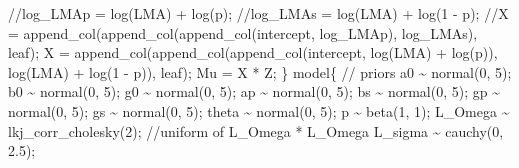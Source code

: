\documentclass[
  12pt,
  letterpaper,
  DIV=11,
  numbers=noendperiod]{scrartcl}
\newenvironment{Shaded}{\begin{snugshade}}{\end{snugshade}}
\newcommand{\CommentTok}[1]{\textcolor[rgb]{0.37,0.37,0.37}{#1}}
\newcommand{\DecValTok}[1]{\textcolor[rgb]{0.68,0.00,0.00}{#1}}
\newcommand{\FloatTok}[1]{\textcolor[rgb]{0.68,0.00,0.00}{#1}}
\newcommand{\KeywordTok}[1]{\textcolor[rgb]{0.00,0.23,0.31}{#1}}
\newcommand{\NormalTok}[1]{\textcolor[rgb]{0.00,0.23,0.31}{#1}}
\begin{document}
\begin{Shaded}
\begin{Highlighting}[]
  \CommentTok{//log\_LMAp = log(LMA) + log(p);}
  \CommentTok{//log\_LMAs = log(LMA) + log(1 {-} p);}
  \CommentTok{//X = append\_col(append\_col(append\_col(intercept, log\_LMAp), log\_LMAs), leaf);}
\NormalTok{  X = append\_col(append\_col(append\_col(intercept,}
\NormalTok{    log(LMA) + log(p)),}
\NormalTok{    log(LMA) + log(}\DecValTok{1}\NormalTok{ {-} p)),}
\NormalTok{     leaf);}
\NormalTok{  Mu = X * Z;}
\NormalTok{\}}
\KeywordTok{model}\NormalTok{\{}
  \CommentTok{// priors}
\NormalTok{  a0 \textasciitilde{} normal(}\DecValTok{0}\NormalTok{, }\DecValTok{5}\NormalTok{);}
\NormalTok{  b0 \textasciitilde{} normal(}\DecValTok{0}\NormalTok{, }\DecValTok{5}\NormalTok{);}
\NormalTok{  g0 \textasciitilde{} normal(}\DecValTok{0}\NormalTok{, }\DecValTok{5}\NormalTok{);}
\NormalTok{  ap \textasciitilde{} normal(}\DecValTok{0}\NormalTok{, }\DecValTok{5}\NormalTok{);}
\NormalTok{  bs \textasciitilde{} normal(}\DecValTok{0}\NormalTok{, }\DecValTok{5}\NormalTok{);}
\NormalTok{  gp \textasciitilde{} normal(}\DecValTok{0}\NormalTok{, }\DecValTok{5}\NormalTok{);}
\NormalTok{  gs \textasciitilde{} normal(}\DecValTok{0}\NormalTok{, }\DecValTok{5}\NormalTok{);}
\NormalTok{  theta \textasciitilde{} normal(}\DecValTok{0}\NormalTok{, }\DecValTok{5}\NormalTok{);}
\NormalTok{  p \textasciitilde{} beta(}\DecValTok{1}\NormalTok{, }\DecValTok{1}\NormalTok{);}
\NormalTok{  L\_Omega \textasciitilde{} lkj\_corr\_cholesky(}\DecValTok{2}\NormalTok{); }\CommentTok{//uniform of L\_Omega * L\_Omega\textquotesingle{}}
\NormalTok{  L\_sigma \textasciitilde{} cauchy(}\DecValTok{0}\NormalTok{, }\FloatTok{2.5}\NormalTok{);}


\end{Highlighting}
\end{Shaded}
\end{document}
